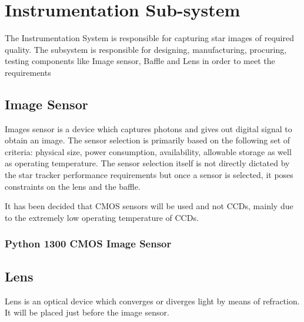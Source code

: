 \chapter{Instrumentation Sub-system}
\thispagestyle{fancy}

%
%
%
%




The Instrumentation System is responsible for capturing star images of required quality. The subsystem is responsible for designing, manufacturing, procuring, testing components like Image sensor, Baffle and Lens in order to meet the requirements 

\section{Image Sensor}
Images sensor is a device which captures photons and gives out digital signal to obtain an image.
The sensor selection is primarily based on the following set of criteria: physical size, power consumption, availability, allowable storage as well as operating temperature. The sensor selection itself is not directly dictated by the star tracker performance requirements but once a sensor is selected, it poses constraints on the lens and the baffle. \par It has been decided that CMOS sensors will be used and not CCDs, mainly due to the extremely low operating temperature of CCDs.
\subsection{Python 1300 CMOS Image Sensor}

\section{Lens}
Lens is an optical device which converges or diverges light by means of refraction. It will be placed just before the image sensor.

